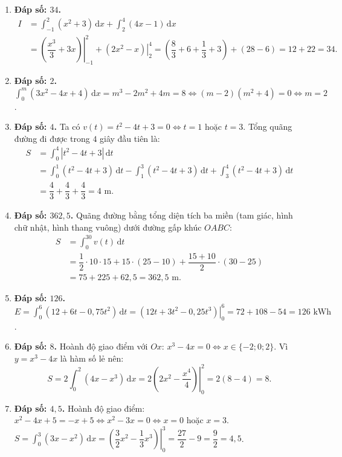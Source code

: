 \documentclass[12pt,a4paper]{article}
\begin{document}
\begin{enumerate}[start=21]
\item \textbf{Đáp số: $34$.}  
\begin{align*}
I &= \int_{-1}^2 (x^2 + 3)\,\mathrm{d}x + \int_2^4 (4x - 1)\,\mathrm{d}x \\
&= \left.\left(\dfrac{x^3}{3} + 3x\right)\right|_{-1}^2 + \left.\left(2x^2 - x\right)\right|_2^4 = \left(\dfrac{8}{3} + 6 + \dfrac{1}{3} + 3\right) + (28 - 6) = 12 + 22 = 34.
\end{align*}

\item \textbf{Đáp số: $2$.}  
$\int_0^m (3x^2 - 4x + 4)\,\mathrm{d}x = m^3 - 2m^2 + 4m = 8 \iff (m - 2)(m^2 + 4) = 0 \iff m = 2$.

\item \textbf{Đáp số: $4$.}  
Ta có $v(t) = t^2 - 4t + 3 = 0 \iff t = 1$ hoặc $t = 3$.  
Tổng quãng đường đi được trong $4$ giây đầu tiên là:
\begin{align*}
S &= \int_0^4 |t^2 - 4t + 3|\,\mathrm{d}t \\
&= \int_0^1 (t^2 - 4t + 3)\,\mathrm{d}t - \int_1^3 (t^2 - 4t + 3)\,\mathrm{d}t + \int_3^4 (t^2 - 4t + 3)\,\mathrm{d}t \\
&= \dfrac{4}{3} + \dfrac{4}{3} + \dfrac{4}{3} = 4\text{ m}.
\end{align*}

\item \textbf{Đáp số: $362{,}5$.}  
Quãng đường bằng tổng diện tích ba miền (tam giác, hình chữ nhật, hình thang vuông) dưới đường gấp khúc $OABC$:
\begin{align*}
S &= \int_0^{30} v(t)\,\mathrm{d}t \\
&= \dfrac{1}{2}\cdot 10\cdot 15 + 15\cdot (25 - 10) + \dfrac{15 + 10}{2}\cdot (30 - 25) \\
&= 75 + 225 + 62{,}5 = 362{,}5\text{ m}.
\end{align*}

\item \textbf{Đáp số: $126$.}  
$E = \int_0^6 (12 + 6t - 0{,}75t^2)\,\mathrm{d}t = \left.\left(12t + 3t^2 - 0{,}25t^3\right)\right|_0^6 = 72 + 108 - 54 = 126\text{ kWh}$.

\item \textbf{Đáp số: $8$.}  
Hoành độ giao điểm với $Ox$: $x^3 - 4x = 0 \iff x \in \{-2; 0; 2\}$.  
Vì $y = x^3 - 4x$ là hàm số lẻ nên:
\[
S = 2\int_0^2 (4x - x^3)\,\mathrm{d}x = 2\left.\left(2x^2 - \dfrac{x^4}{4}\right)\right|_0^2 = 2(8 - 4) = 8.
\]

\item \textbf{Đáp số: $4{,}5$.}  
Hoành độ giao điểm: $x^2 - 4x + 5 = -x + 5 \iff x^2 - 3x = 0 \iff x = 0$ hoặc $x = 3$.  
$S = \int_0^3 (3x - x^2)\,\mathrm{d}x = \left.\left(\dfrac{3}{2}x^2 - \dfrac{1}{3}x^3\right)\right|_0^3 = \dfrac{27}{2} - 9 = \dfrac{9}{2} = 4{,}5$.


\end{enumerate}
\end{document}
